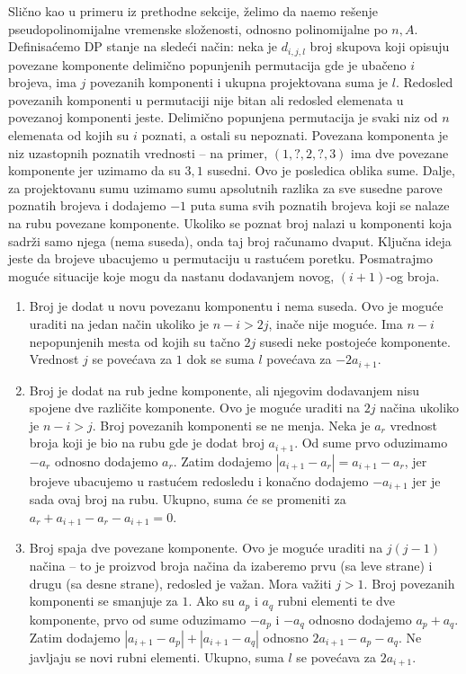 \documentclass[a4paper,12pt]{article}
\numberwithin{equation}{subsection}
\begin{document}
Sli\v cno kao u primeru iz prethodne sekcije, \v zelimo da na\dj emo re\v senje pseudopolinomijalne vremenske slo\v zenosti, odnosno polinomijalne po $n, A$. Definisa\' cemo DP stanje na slede\' ci na\v cin: neka je $d_{i,j,l}$ broj skupova koji opisuju povezane komponente delimi\v cno popunjenih permutacija gde je uba\v ceno $i$ brojeva, ima $j$ povezanih komponenti i ukupna projektovana suma je $l$. Redosled povezanih komponenti u permutaciji nije bitan ali redosled elemenata u povezanoj komponenti jeste. Delimi\v cno popunjena permutacija je svaki niz od $n$ elemenata od kojih su $i$ poznati, a ostali su nepoznati. Povezana komponenta je niz uzastopnih poznatih vrednosti -- na primer, $(1, ?, 2, ?, 3)$ ima dve povezane komponente jer uzimamo da su $3,1$ susedni. Ovo je posledica oblika sume. Dalje, za projektovanu sumu uzimamo sumu apsolutnih razlika za sve susedne parove poznatih brojeva i dodajemo $-1$ puta suma svih poznatih brojeva koji se nalaze na rubu povezane komponente. Ukoliko se poznat broj nalazi u komponenti koja sadr\v zi samo njega (nema suseda), onda taj broj ra\v cunamo dvaput. Klju\v cna ideja jeste da brojeve ubacujemo u permutaciju u rastu\' cem poretku. Posmatrajmo mogu\' ce situacije koje mogu da nastanu dodavanjem novog, $(i+1)$-og broja.
\begin{enumerate}
\item Broj je dodat u novu povezanu komponentu i nema suseda. Ovo je mogu\' ce uraditi na jedan na\v cin ukoliko je $n-i > 2j$, ina\v ce nije mogu\' ce. Ima $n-i$ nepopunjenih mesta od kojih su ta\v cno $2j$ susedi neke postoje\' ce komponente. Vrednost $j$ se pove\' cava za $1$ dok se suma $l$ pove\' cava za $-2a_{i+1}$.
\item Broj je dodat na rub jedne komponente, ali njegovim dodavanjem nisu spojene dve razli\v cite komponente. Ovo je mogu\' ce uraditi na $2j$ na\v cina ukoliko je $n-i > j$. Broj povezanih komponenti se ne menja. Neka je $a_r$ vrednost broja koji je bio na rubu gde je dodat broj $a_{i+1}$. Od sume prvo oduzimamo $-a_r$ odnosno dodajemo $a_r$. Zatim dodajemo $|a_{i+1} - a_r| = a_{i+1} - a_r$, jer brojeve ubacujemo u rastu\' cem redosledu i kona\v cno dodajemo $-a_{i+1}$ jer je sada ovaj broj na rubu. Ukupno, suma \' ce se promeniti za $a_r + a_{i+1} - a_r - a_{i+1} = 0$.
\item Broj spaja dve povezane komponente. Ovo je mogu\' ce uraditi na $j(j-1)$ na\v cina -- to je proizvod broja na\v cina da izaberemo prvu (sa leve strane) i drugu (sa desne strane), redosled je va\v zan. Mora va\v ziti $j>1$. Broj povezanih komponenti se smanjuje za $1$. Ako su $a_p$ i $a_q$ rubni elementi te dve komponente, prvo od sume oduzimamo $-a_p$ i $-a_q$ odnosno dodajemo $a_p+a_q$. Zatim dodajemo $|a_{i+1}-a_p| + |a_{i+1}-a_q|$ odnosno $2a_{i+1}-a_p-a_q$. Ne javljaju se novi rubni elementi. Ukupno, suma $l$ se pove\' cava za $2a_{i+1}$.
\end{enumerate}
\end{document}
